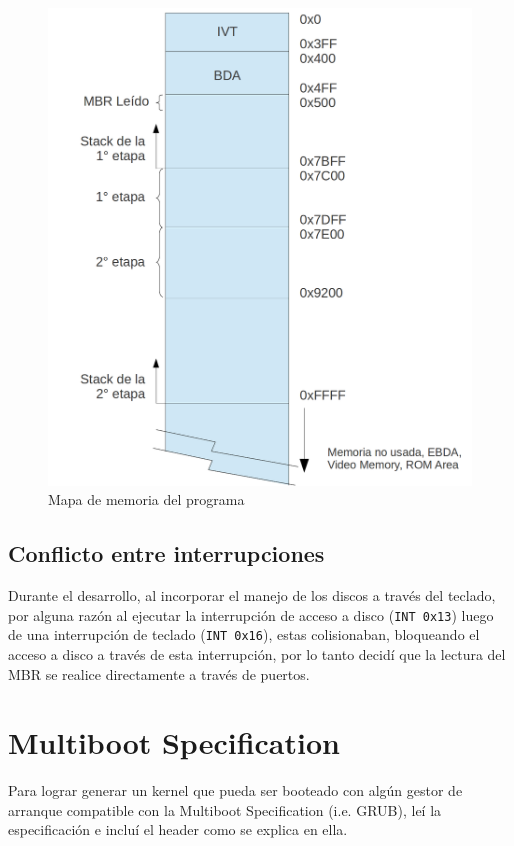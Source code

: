 \documentclass[a4paper, 11pt]{article}
\begin{document}
\begin{figure}
\centering
\includegraphics[scale=0.8]{Memoria.png}
\caption{ Mapa de memoria del programa }
\label{fig:memoria}
\end{figure}

\subsection*{Conflicto entre interrupciones}

Durante el desarrollo, al incorporar el manejo de los discos a trav\'es del teclado, por alguna raz\'on al ejecutar la interrupci\'on de acceso a disco (\verb!INT 0x13!) luego de una interrupci\'on de teclado (\verb!INT 0x16!), estas colisionaban, bloqueando el acceso a disco a trav\'es de esta interrupci\'on, por lo tanto decid\'i que la lectura del MBR se realice directamente a trav\'es de puertos.

\section*{Multiboot Specification}
Para lograr generar un kernel que pueda ser booteado con alg\'un gestor de arranque compatible con la Multiboot Specification (i.e. GRUB), le\'i la especificaci\'on e inclu\'i el header como se explica en ella.
\\
\end{document}
